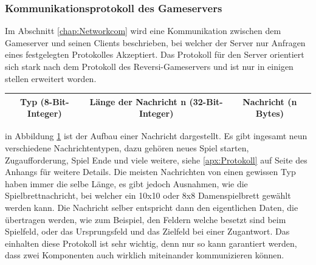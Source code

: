 \documentclass[12pt,a4paper,bibliography=totocnumbered,listof=totocnumbered]{article}
\begin{document}
\subsubsection{Kommunikationsprotokoll des Gameservers}
Im Abschnitt \ref{chap:Networkcom} wird eine Kommunikation zwischen dem Gameserver und seinen Clients beschrieben, bei welcher der 
Server nur Anfragen eines festgelegten Protokolles Akzeptiert. Das Protokoll für den Server orientiert sich stark nach dem Protokoll
des Reversi-Gameservers und ist nur in einigen stellen erweitert worden.
%
\begin{table}[H]
    \centering
    \begin{tabular} {|c|c|c|}
        \hline
        Typ (8-Bit-Integer) & Länge der Nachricht n (32-Bit-Integer) & Nachricht (n Bytes) \\
        \hline
    \end{tabular}
    \label{fig:Nachritenaufbau}
\end{table}

in Abbildung \ref{fig:Nachritenaufbau} ist der Aufbau einer Nachricht dargestellt. Es gibt ingesamt neun verschiedene Nachrichtentypen, dazu gehören 
neues Spiel starten, Zugaufforderung, Spiel Ende und viele weitere, siehe \ref{apx:Protokoll} auf Seite \pageref{apx:Protokoll} des Anhangs für weitere Details. 
Die meisten Nachrichten von einen gewissen Typ haben immer die selbe Länge, es gibt jedoch
Ausnahmen, wie die Spielbrettnachricht, bei welcher ein 10x10 oder 8x8 Damenspielbrett gewählt werden kann. Die Nachricht selber entspricht dann den eigentlichen 
Daten, die übertragen werden, wie zum Beispiel, den Feldern welche besetzt sind beim Spielfeld, oder das Ursprungsfeld und das Zielfeld bei einer Zugantwort. 
Das einhalten diese Protokoll ist sehr wichtig, denn nur so kann garantiert werden, dass zwei Komponenten auch wirklich miteinander kommunizieren können.
\end{document}
